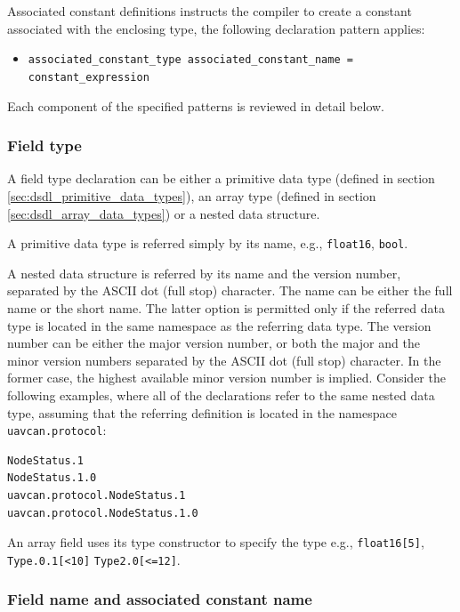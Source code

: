 Associated constant definitions instructs the compiler to create a constant associated with the enclosing type,
the following declaration pattern applies:
\begin{itemize}
    \item \verb|associated_constant_type associated_constant_name = constant_expression|
\end{itemize}

Each component of the specified patterns is reviewed in detail below.

\subsubsection{Field type}

A field type declaration can be either a primitive data type (defined in section \ref{sec:dsdl_primitive_data_types}),
an array type (defined in section \ref{sec:dsdl_array_data_types}) or a nested data structure.

A primitive data type is referred simply by its name, e.g., \verb|float16|, \verb|bool|.

A nested data structure is referred by its name and the version number,
separated by the ASCII dot (full stop) character.
The name can be either the full name or the short name.
The latter option is permitted only if the referred data type is located in the same namespace as
the referring data type.
The version number can be either the major version number, or both the major and the minor version
numbers separated by the ASCII dot (full stop) character.
In the former case, the highest available minor version number is implied.
Consider the following examples,
where all of the declarations refer to the same nested data type, assuming that the referring definition is
located in the namespace \verb|uavcan.protocol|:

\begin{verbatim}
NodeStatus.1
NodeStatus.1.0
uavcan.protocol.NodeStatus.1
uavcan.protocol.NodeStatus.1.0
\end{verbatim}

An array field uses its type constructor to specify the type e.g.,
\verb|float16[5]|, \verb|Type.0.1[<10]| \verb|Type2.0[<=12]|.

\subsubsection{Field name and associated constant name}

